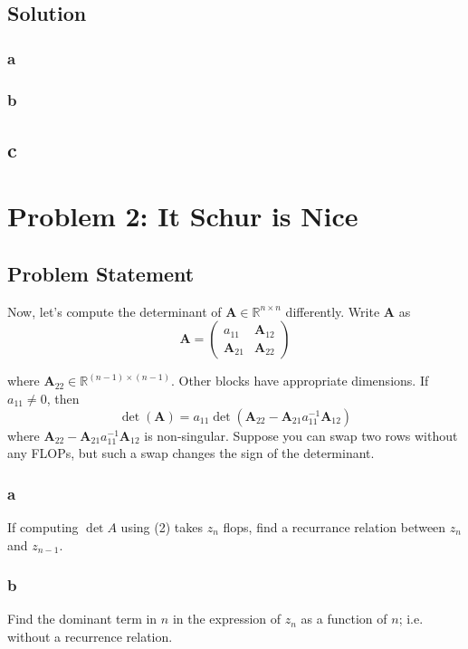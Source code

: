 \documentclass[11pt]{report}
\theoremstyle{definition}
\newcommand{\mat}[1]{\mathbf{#1}}
\begin{document}
\subsection*{Solution}
\subsubsection*{a}

\subsubsection*{b}

\subsection*{c}

\newpage

\section*{Problem 2: It Schur is Nice}
\subsection*{Problem Statement}
Now, let's compute the determinant of $\mat{A}\in\mathbb{R}^{n\times n}$ differently.
Write $\mat{A}$ as
\begin{equation}
	\mat{A} = \begin{pmatrix}
		a_{11}       & \mat{A}_{12} \\
		\mat{A}_{21} & \mat{A}_{22}
	\end{pmatrix}
\end{equation}

where $\mat{A}_{22}\in\mathbb{R}^{(n-1)\times(n-1)}$. Other blocks have
appropriate dimensions.  If $a_{11}\neq 0$, then
\[ \det(\mat{A})=a_{11}\det(\mat{A}_{22}-\mat{A}_{21}a_{11}^{-1}\mat{A}_{12}) \]
where $\mat{A}_{22}-\mat{A}_{21}a_{11}^{-1}\mat{A}_{12}$ is non-singular.
Suppose you can swap two rows without any FLOPs, but such a swap changes the
sign of the determinant.

\subsubsection*{a}
If computing $\det{A}$ using (2) takes $z_n$ flops, find a recurrance relation
between $z_n$ and $z_{n-1}$.

\subsubsection*{b}
Find the dominant term in $n$ in the expression of $z_n$ as a function of $n$;
i.e. without a recurrence relation.
\end{document}
